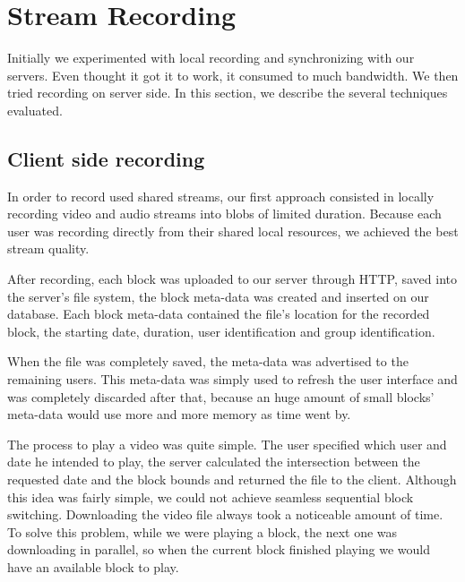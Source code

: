 \section{Stream Recording}
 Initially we experimented with local recording and synchronizing with our servers. Even thought it got it to work, it consumed to much bandwidth. We then tried recording on server side. In this section, we describe the several techniques evaluated.


\subsection{Client side recording}
In order to record used shared streams, our first approach consisted in locally recording video and audio streams into blobs of limited duration. Because each user was recording directly from their shared local resources, we achieved the best stream quality.

After recording, each block was uploaded to our server through \ac{HTTP}, saved into the server's file system, the block meta-data was created and inserted on our database. Each block meta-data contained the file's location for the recorded block, the starting date, duration, user identification and group identification.

When the file was completely saved, the meta-data was advertised to the remaining users. This meta-data was simply used to refresh the user interface and was completely discarded after that, because an huge amount of small blocks' meta-data would use more and more memory as time went by. 

	The process to play a video was quite simple. The user specified which user and date he intended to play, the server calculated the intersection between the requested date and the block bounds and returned the file to the client.
	Although this idea was fairly simple, we could not achieve seamless sequential block switching. Downloading the video file always took a noticeable amount of time. To solve this problem, while we were playing a block, the next one was downloading in parallel, so when the current block finished playing we would have an available block to play. 

